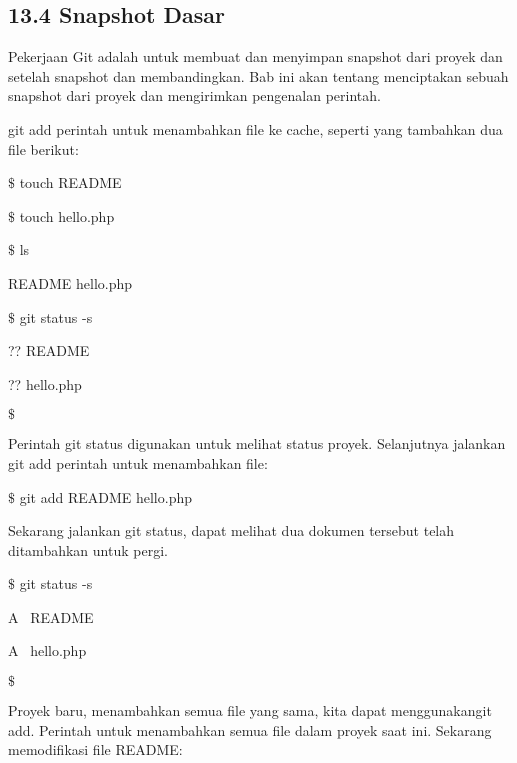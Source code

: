 \subsection*{13.4 Snapshot Dasar }
 \par
Pekerjaan Git adalah untuk membuat dan menyimpan snapshot dari proyek dan setelah snapshot dan membandingkan. Bab ini akan tentang menciptakan sebuah snapshot dari proyek  dan mengirimkan pengenalan perintah. \par
\vspace{12pt}
\noindent 
git add perintah untuk menambahkan file ke cache, seperti yang tambahkan dua file berikut: \par
\noindent 
{\fontsize{10pt}{10pt}\selectfont  $  \$  $ touch README} \par
\noindent 
{\fontsize{10pt}{10pt}\selectfont  $  \$  $ touch hello.php} \par
\noindent 
{\fontsize{10pt}{10pt}\selectfont  $  \$  $ ls} \par
\noindent 
{\fontsize{10pt}{10pt}\selectfont README hello.php} \par
\noindent 
{\fontsize{10pt}{10pt}\selectfont  $  \$  $ git status -s} \par
\noindent 
{\fontsize{10pt}{10pt}\selectfont ?? README} \par
\noindent 
{\fontsize{10pt}{10pt}\selectfont ?? hello.php} \par
\noindent 
{\fontsize{10pt}{10pt}\selectfont  $  \$  $ } \par
\noindent 
Perintah git status digunakan untuk melihat status proyek. {\fontsize{10pt}{10pt}\selectfont  Selanjutnya jalankan git add perintah untuk menambahkan file: } \par
\noindent 
{\fontsize{10pt}{10pt}\selectfont  $  \$  $ git add README hello.php } \par
\noindent 
\vspace{12pt}
Sekarang jalankan git status, dapat melihat dua dokumen tersebut telah ditambahkan untuk pergi.  \par
\noindent 
{\fontsize{10pt}{10pt}\selectfont  $  \$  $ git status -s} \par
\noindent 
{\fontsize{10pt}{10pt}\selectfont A~ README} \par
\noindent 
{\fontsize{10pt}{10pt}\selectfont A~ hello.php} \par
\noindent 
{\fontsize{10pt}{10pt}\selectfont  $  \$  $ } \par
\vspace{12pt}
Proyek baru, menambahkan semua file yang sama, kita dapat menggunakangit add. Perintah untuk menambahkan semua file dalam proyek saat ini. Sekarang memodifikasi file README:   \par
